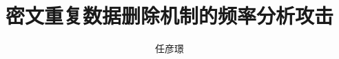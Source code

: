 \documentclass[bachelor]{thesis-uestc}
\title{密文重复数据删除机制的频率分析攻击}
\author{任彦璟}
\begin{document}
\thesischapterexordium



\nocite{*}


\end{document}
